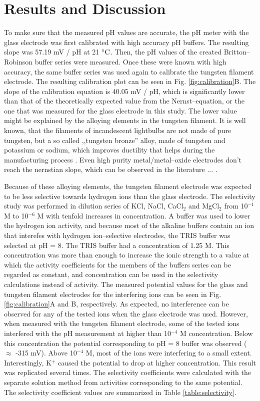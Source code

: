\documentclass[manuscript=article, journal=jceda8]{achemso}
\begin{document}
\section{Results and Discussion}

To make sure that the measured pH values are accurate, the pH meter with the glass electrode was first calibrated with high accuracy pH buffers. The resulting slope was 57.19 mV / pH at 21 $\celsius$. Then, the pH values of the created Britton--Robinson buffer series were measured. Once these were known with high accuracy, the same buffer series was used again to calibrate the tungsten filament electrode. The resulting calibration plot can be seen in Fig. \ref{fig:calibration}B. The slope of the calibration equation is 40.05 mV / pH, which is significantly lower than that of the theoretically expected value from the Nernst--equation, or the one that was measured for the glass electrode in this study. The lower value might be explained by the alloying elements in the tungsten filament. It is well known, that the filaments of incandescent lightbulbs are not made of pure tungsten, but a so called ,,tungsten bronze'' alloy, made of tungsten and potassium or sodium, which improves ductility that helps during the manufacturing process \cite{cisternas2015electrode, wechter1972use, schade2010100}. Even high purity metal/metal--oxide electrodes don't reach the nernstian slope, which can be observed in the literature ... .

Because of these alloying elements, the tungsten filament electrode was expected to be less selective towards hydrogen ions than the glass electrode. The selectivity study was performed in dilution series of KCl, NaCl, CaCl$_2$ and MgCl$_2$ from 10$^{-1}$ M to 10$^{-6}$ M with tenfold increases in concentration. A buffer was used to lower the hydrogen ion activity, and because most of the alkaline buffers contain an ion that interefes with hydrogen ion--selective electrodes, the TRIS buffer was selected at pH = 8. The
TRIS buffer had a concentration of 1.25 M. This concentration was more than enough to increase the ionic strength to a value at which the activity coefficients for the members of the buffers series can be regarded as constant, and concentration can be used in the selectivity calculations instead of activity. The measured potential values for the glass and tungsten filament electrodes for the interfering ions can be seen in Fig. \ref{fig:calibration}A and B, respectively. As expected, no interference can be observed for any of the tested ions when the glass electrode was used. However, when measured with the tungsten filament electrode, some of the tested ions interfered with the pH measurement at higher than 10$^{-4}$ M concentration. Below this concentration the potential corresponding to pH = 8 buffer was observed ($\approx$ -315 mV). Above 10$^{-4}$ M, most of the ions were interfering to a small extent. Interestingly, K$^+$ caused the potential to drop at higher concentration. This result was replicated several times. The selectivity coefficients were calculated with the separate solution method from activities corresponding to the same potential. The selectivity coefficient values are summarized in Table \ref{table:selectivity}.
\end{document}
